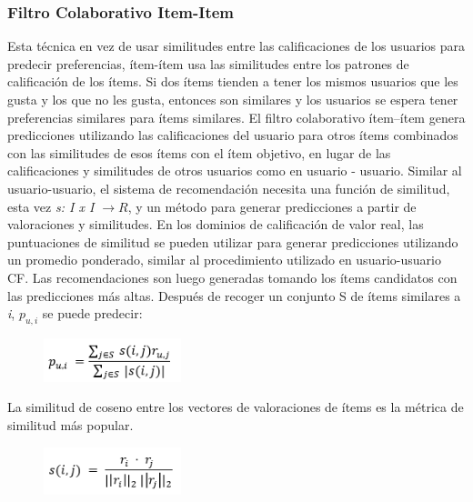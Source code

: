 \documentclass[12pt,letterpaper,openany]{book}
\begin{document}
\subsubsection{Filtro Colaborativo Item-Item \cite{23}}
Esta técnica en vez de usar similitudes entre las calificaciones de los usuarios para predecir preferencias, ítem-ítem usa las similitudes entre los patrones de calificación de los ítems. Si dos ítems tienden a tener los mismos usuarios que les gusta y los que no les gusta, entonces son similares y los usuarios se espera tener preferencias similares para ítems similares.
\vspace{5mm}\newline
El filtro colaborativo ítem–ítem genera predicciones utilizando las calificaciones del usuario para otros ítems combinados con las similitudes de esos ítems con el ítem objetivo, en lugar de las calificaciones y similitudes de otros usuarios como en usuario - usuario. Similar al usuario-usuario, el sistema de recomendación necesita una función de similitud, esta vez \textit{s: I x I $\rightarrow{R}$}, y un método para generar predicciones a partir de valoraciones y similitudes.
\vspace{5mm}\newline
En los dominios de calificación de valor real, las puntuaciones de similitud se pueden utilizar para generar predicciones utilizando un promedio ponderado, similar al procedimiento utilizado en usuario-usuario CF. Las recomendaciones son luego generadas tomando los ítems candidatos con las predicciones más altas.
\vspace{5mm}\newline
Después de recoger un conjunto S de ítems similares a \textit{i}, $p_{u,i}$ se puede predecir:

\begin{figure}[H]
\begin{center}
\includegraphics[width=4cm]{./imagenes/formulas/form3}
\end{center}
\end{figure}

La similitud de coseno entre los vectores de valoraciones de ítems es la métrica de similitud más popular.

\begin{figure}[H]
\begin{center}
\includegraphics[width=4cm]{./imagenes/formulas/form4}
\end{center}
\end{figure}
\end{document}
